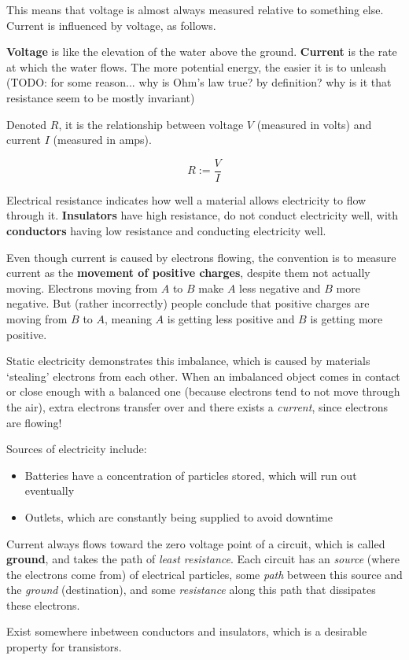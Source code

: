 This means that voltage is almost always measured relative to something else. Current is influenced by voltage, as follows.

\begin{example}
    \textbf{Voltage} is like the elevation of the water above the ground. \textbf{Current} is the rate at which the water flows. The more potential energy, the easier it is to unleash (TODO: for some reason... why is Ohm's law true? by definition? why is it that resistance seem to be mostly invariant)
\end{example}

\begin{definition}[Resistance]
    Denoted $R$, it is the relationship between voltage $V$ (measured in volts) and current $I$ (measured in amps).
\end{definition}
\[
R := \frac{V}{I}
\]

Electrical resistance indicates how well a material allows electricity to flow through it. \textbf{Insulators} have high resistance, do not conduct electricity well, with \textbf{conductors} having low resistance and conducting electricity well.

\begin{remark}
    Even though current is caused by electrons flowing, the convention is to measure current as the \textbf{movement of positive charges}, despite them not actually moving. Electrons moving from $A$ to $B$ make $A$ less negative and $B$ more negative. But (rather incorrectly) people conclude that positive charges are moving from $B$ to $A$, meaning $A$ is getting less positive and $B$ is getting more positive.
\end{remark}

Static electricity demonstrates this imbalance, which is caused by materials `stealing' electrons from each other. When an imbalanced object comes in contact or close enough with a balanced one (because electrons tend to not move through the air), extra electrons transfer over and there exists a \textit{current}, since electrons are flowing!

\newpage

Sources of electricity include:
\begin{itemize}
\item Batteries have a concentration of particles stored, which will run out eventually
\item Outlets, which are constantly being supplied to avoid downtime
\end{itemize}

Current always flows toward the zero voltage point of a circuit, which is called \textbf{ground}, and takes the path of \textit{least resistance}. Each circuit has an \textit{source} (where the electrons come from) of electrical particles, some \textit{path} between this source and the \textit{ground} (destination), and some \textit{resistance} along this path that dissipates these electrons.

\begin{definition}[Semiconductor]
Exist somewhere inbetween conductors and insulators, which is a desirable property for transistors.
\end{definition}
